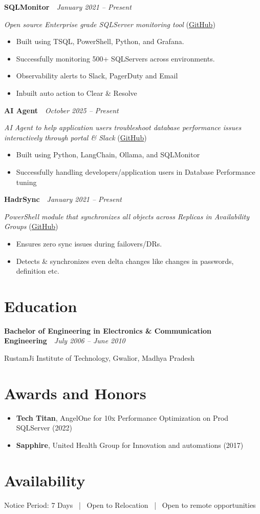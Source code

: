 \documentclass[10pt,a4paper]{article}
\begin{document}
\noindent\textbf{SQLMonitor}~\hfill~\textit{January 2021 -- Present}

\textit{Open source Enterprise grade SQLServer monitoring tool} (\href{https://github.com/imajaydwivedi/SQLMonitor}{GitHub})
\begin{itemize}
  \item Built using TSQL, PowerShell, Python, and Grafana.
  \item Successfully monitoring 500+ SQLServers across environments.
  \item Observability alerts to Slack, PagerDuty and Email
  \item Inbuilt auto action to Clear \& Resolve
\end{itemize}

\noindent\textbf{AI Agent}~\hfill~\textit{October 2025 -- Present}

\textit{AI Agent to help application users troubleshoot database performance issues interactively through portal \& Slack} (\href{https://github.com/imajaydwivedi/SQLMonitor/tree/dev/AI-Agent}{GitHub})
\begin{itemize}
  \item Built using Python, LangChain, Ollama, and SQLMonitor
  \item Successfully handling developers/application users in Database Performance tuning
\end{itemize}

\noindent\textbf{HadrSync}~\hfill~\textit{January 2021 -- Present}

\textit{PowerShell module that synchronizes all objects across Replicas in Availability Groups} (\href{https://github.com/imajaydwivedi/HadrSync}{GitHub})
\begin{itemize}
  \item Ensures zero sync issues during failovers/DRs.
  \item Detects \& synchronizes even delta changes like changes in passwords, definition etc.
\end{itemize}

\section{Education}
\noindent\textbf{Bachelor of Engineering in Electronics \& Communication Engineering}~\hfill~\textit{July 2006 -- June 2010}

RustamJi Institute of Technology, Gwalior, Madhya Pradesh

\section{Awards and Honors}
\begin{itemize}
  \item \textbf{Tech Titan}, AngelOne for 10x Performance Optimization on Prod SQLServer (2022)
  \item \textbf{Sapphire}, United Health Group for Innovation and automations (2017)
\end{itemize}

\section{Availability}
Notice Period: 7 Days  ~|~  Open to Relocation  ~|~  Open to remote opportunities
\end{document}
